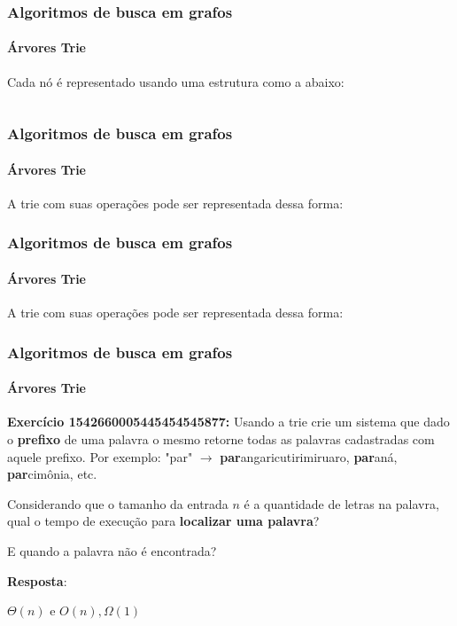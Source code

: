 \begin{frame}
	\frametitle{Algoritmos de busca em grafos}
	\framesubtitle{Árvores Trie}
		\par Cada nó é representado usando uma estrutura como a abaixo:
		\begin{columns}
			\begin{column}{0.5\textwidth}
				
			\end{column}
			\begin{column}{0.5\textwidth}
				
			\end{column}
		\end{columns}
\end{frame}

\begin{frame}
	\frametitle{Algoritmos de busca em grafos}
	\framesubtitle{Árvores Trie}
	\par A trie com suas operações pode ser representada dessa forma:
	
\end{frame}

\begin{frame}[allowframebreaks]
	\frametitle{Algoritmos de busca em grafos}
	\framesubtitle{Árvores Trie}
	\par A trie com suas operações pode ser representada dessa forma:
	
\end{frame}


\begin{frame}
	\frametitle{Algoritmos de busca em grafos}
	\framesubtitle{Árvores Trie}
	\par \textbf{Exercício 1542660005445454545877:} Usando a trie crie um sistema que dado o \textbf{prefixo} de uma palavra o mesmo retorne todas as palavras cadastradas com aquele prefixo. Por exemplo: "par" $\rightarrow$ \textbf{par}angaricutirimiruaro, \textbf{par}aná, \textbf{par}cimônia, etc.
	\par Considerando que o tamanho da entrada $n$ é a quantidade de letras na palavra, qual o tempo de execução para \textbf{localizar uma palavra}?
	\par E quando a palavra não é encontrada?\newline
	\pause
	\par \textbf{Resposta}:
	\par $\Theta(n)$ e $O(n), \Omega(1)$
\end{frame}